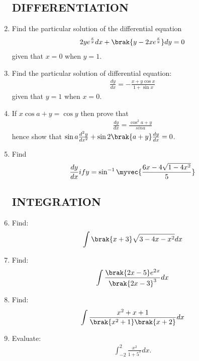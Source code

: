 \documentclass[12pt, -letter paper]{article}
\begin{document}
\begin{enumerate}
		\subsection*{DIFFERENTIATION}

	\item Find the particular solution of the differential equation\begin{align*} 2ye^\frac{x}{y}dx+\brak{{y-2xe^\frac{x}{y}}}dy=0 \end{align*} given that $x=0$  when $y=1$.		




		\item Find the particular solution of differential equation:\begin{align*}  \frac{dy}{dx}=-\frac{x+y\cos x}{1+\sin x} \end{align*} given that $y=1$ when $x=0$. 


 \item If $x\cos{a+y}=\cos{y}$ then prove that \begin{align*}    \frac{dy}{dx}=\frac{\cos^2 a+y}{sina} \end{align*}                hence show that $\sin a\frac{d^{2}y}{dx^2}+\sin2\brak{a+y}\frac{dy}{dx}=0$.

   \item Find \begin{align*}\frac{dy}{dx} if y=\sin^{-1}\myvec{\frac{6x-4\sqrt{1-4x^2}}{5}} \end{align*}

	\subsection*{INTEGRATION}	
				
\item Find:\begin{align*}\int{\brak{x+3}}\sqrt{3-4x-x^2}dx
\end{align*}



\item Find:\begin{align*}\int\frac{\brak{2x-5}e^2{}^x}{\brak{2x-3}^3}dx \end{align*}


	\item Find:\begin{align*}\int\frac{x^2+x+1}{\brak{x^2+1}\brak{x+2}}dx \end{align*}

\item Evaluate:\begin{align*}\int_{-2}^{2}\frac{x^2}{    1+5^x}dx. \end{align*}
			

\end{enumerate}
\end{document}
